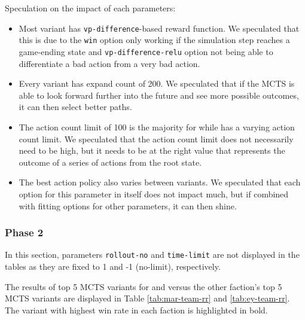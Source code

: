 Speculation on the impact of each parameters:
\begin{itemize}
    \item Most variant has \texttt{vp-difference}-based reward function. We speculated that this is due to the \texttt{win} option only working if the simulation step reaches a game-ending state and \texttt{vp-difference-relu} option not being able to differentiate a bad action from a very bad action.
    \item Every variant has expand count of 200. We speculated that if the MCTS is able to look forward further into the future and see more possible outcomes, it can then select better paths.
    \item The action count limit of 100 is the majority for \Marquise{} while \Eyrie{} has a varying action count limit. We speculated that the action count limit does not necessarily need to be high, but it needs to be at the right value that represents the outcome of a series of actions from the root state.
    \item The best action policy also varies between variants. We speculated that each option for this parameter in itself does not impact much, but if combined with fitting options for other parameters, it can then shine.
\end{itemize}

\subsubsection{Phase 2}


In this section, parameters \texttt{rollout-no} and \texttt{time-limit} are not displayed in the tables as they are fixed to 1 and -1 (no-limit), respectively.

The results of top 5 MCTS variants for \Marquise{} and \Eyrie{} versus the other faction's top 5 MCTS variants are displayed in Table \ref{tab:mar-team-rr} and \ref{tab:ey-team-rr}. The variant with highest win rate in each faction is highlighted in bold.

